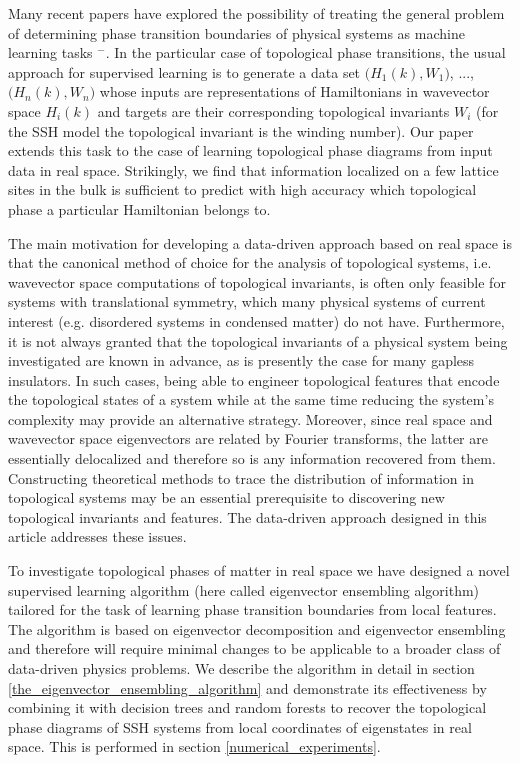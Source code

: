 \documentclass[10pt]{revtex4-1}
\begin{document}
Many recent papers have explored the possibility of treating the general problem of determining phase transition boundaries of physical systems as machine learning tasks \cite{carrasquilla2017machine}$^-$\cite{rodriguez2018identifying}. In the particular case of topological phase transitions, the usual approach for supervised learning is to generate a data set $\big(H_1(k), W_1\big)$, ..., $\big(H_n(k), W_n\big)$ whose inputs are representations of Hamiltonians in wavevector space $H_i(k)$ and targets are their corresponding topological invariants $W_i$ (for the SSH model the topological invariant is the winding number). Our paper extends this task to the case of learning topological phase diagrams from input data in real space. Strikingly, we find that information localized on a few lattice sites in the bulk is sufficient to predict with high accuracy which topological phase a particular Hamiltonian belongs to.

The main motivation for developing a data-driven approach based on real space is that the canonical method of choice for the analysis of topological systems, i.e. wavevector space computations of topological invariants, is often only feasible for systems with translational symmetry, which many physical systems of current interest (e.g. disordered systems in condensed matter) do not have. Furthermore, it is not always granted that the topological invariants of a physical system being investigated are known in advance, as is presently the case for many gapless insulators. In such cases, being able to engineer topological features that encode the topological states of a system while at the same time reducing the system's complexity may provide an alternative strategy. Moreover, since real space and wavevector space eigenvectors are related by Fourier transforms, the latter are essentially delocalized and therefore so is any information recovered from them. Constructing theoretical methods to trace the distribution of information in topological systems may be an essential prerequisite to discovering new topological invariants and features. The data-driven approach designed in this article addresses these issues. %

To investigate topological phases of matter in real space we have designed a novel supervised learning algorithm (here called eigenvector ensembling algorithm) tailored for the task of learning phase transition boundaries from local features. The algorithm is based on eigenvector decomposition and eigenvector ensembling and therefore will require minimal changes to be applicable to a broader class of data-driven physics problems. We describe the algorithm in detail in section \ref{the_eigenvector_ensembling_algorithm} and demonstrate its effectiveness by combining it with decision trees and random forests to recover the topological phase diagrams of SSH systems from local coordinates of eigenstates in real space. This is performed in section \ref{numerical_experiments}.
\end{document}
